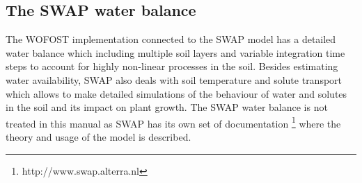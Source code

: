 \subsection{The SWAP water balance}

The WOFOST implementation connected to the SWAP model has a detailed water balance which including 
multiple soil layers and variable integration time steps to account for highly non-linear processes 
in the soil. Besides estimating water availability, SWAP also deals with soil temperature and solute 
transport which allows to make 
detailed simulations of the behaviour of water and solutes in the soil and its impact on plant growth.
The SWAP water balance is not treated in this manual as SWAP has its own set of documentation 
\footnote{http://www.swap.alterra.nl} where the theory and usage of the model is described.
